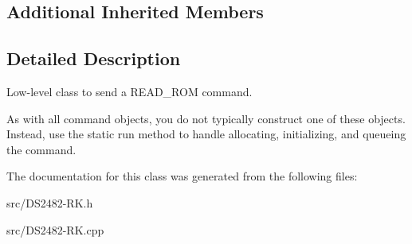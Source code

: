 \subsection*{Additional Inherited Members}


\subsection{Detailed Description}
Low-\/level class to send a R\+E\+A\+D\+\_\+\+R\+OM command. 

As with all command objects, you do not typically construct one of these objects. Instead, use the static run method to handle allocating, initializing, and queueing the command. 

The documentation for this class was generated from the following files\+:\begin{DoxyCompactItemize}
\item 
src/D\+S2482-\/\+R\+K.\+h\item 
src/D\+S2482-\/\+R\+K.\+cpp\end{DoxyCompactItemize}
